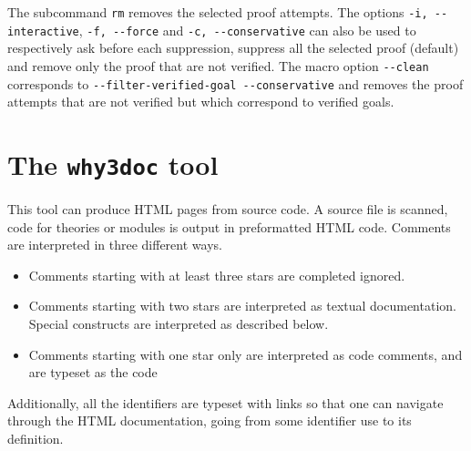 The subcommand \texttt{rm} removes the selected proof
attempts. The options \verb|-i, --interactive|, \verb|-f, --force| and
\verb|-c, --conservative| can also be used to respectively ask before
each suppression, suppress all the selected proof (default) and remove
only the proof that are not verified. The macro option \verb|--clean|
corresponds to \verb|--filter-verified-goal --conservative| and
removes the proof attempts that are not verified but which correspond
to verified goals.





\section{The \texttt{why3doc} tool}
\label{sec:why3doc}

This tool can produce HTML pages from \why source code. A source file
is scanned, \why code for theories or modules is output in
preformatted HTML code. Comments are interpreted in three different ways.
\begin{itemize}
\item Comments starting with at least three stars are completed
  ignored.
\item Comments starting with two stars are interpreted as textual
  documentation. Special constructs are interpreted as described
  below.
\item Comments starting with one star only are interpreted as code
  comments, and are typeset as the code
\end{itemize}

Additionally, all the \why identifiers are typeset with links so that
one can navigate through the HTML documentation, going from some
identifier use to its definition.

